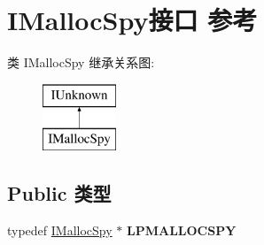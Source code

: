 \hypertarget{interface_i_malloc_spy}{}\section{I\+Malloc\+Spy接口 参考}
\label{interface_i_malloc_spy}
类 I\+Malloc\+Spy 继承关系图\+:\begin{figure}[H]
\begin{center}
\leavevmode
\includegraphics[height=2.000000cm]{interface_i_malloc_spy}
\end{center}
\end{figure}
\subsection*{Public 类型}
\begin{DoxyCompactItemize}
\item 
\mbox{\label{interface_i_malloc_spy_a6d752c1239483095077c1fc5f245217d}} 
typedef \hyperlink{interface_i_malloc_spy}{I\+Malloc\+Spy} $\ast$ {\bfseries L\+P\+M\+A\+L\+L\+O\+C\+S\+PY}
\end{DoxyCompactItemize}

